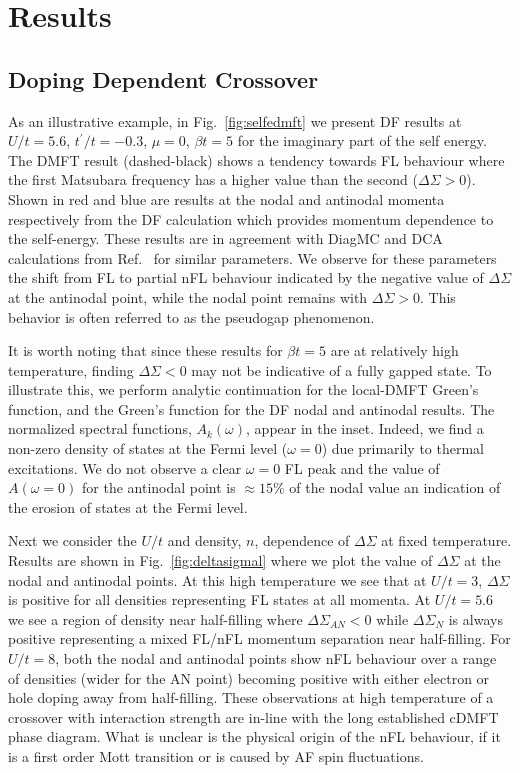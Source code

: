 \documentclass[twocolumn,notitlepage,prb,superscriptaddress,showpacs]{revtex4-1}
\begin{document}
\section{Results  \label{sec:results}}


\subsection{Doping Dependent Crossover}
As an illustrative example, in Fig.~\ref{fig:selfedmft} we present DF results at $U/t=5.6$, $t^\prime/t=-0.3$, $\mu=0$, $\beta t=5$ for the imaginary part of the self energy. The DMFT result (dashed-black) shows a tendency towards FL behaviour where the first Matsubara frequency has a higher value than the second ($\Delta \Sigma > 0$).  Shown in red and blue are results at the nodal and antinodal momenta respectively from the DF calculation which provides momentum dependence to the self-energy. 
These results are in agreement with  DiagMC and DCA calculations from  Ref.~ for similar parameters.  We observe for these parameters the shift from FL to partial nFL behaviour indicated by the negative value of $\Delta \Sigma$ at the antinodal point, while the nodal point remains with $\Delta \Sigma >0$.
This behavior is often referred to as the pseudogap phenomenon.\cite{gull:2009, ferrero:2009, yrzreview:2012, leblanc:2011} 

It is worth noting that since these results for $\beta t=5$ are at relatively high temperature, finding $\Delta \Sigma <0$ may not be indicative of a fully gapped state.  
To illustrate this, we perform analytic continuation\cite{maxent} for the local-DMFT Green's function, and the Green's function for the DF nodal and antinodal results.  
The normalized spectral functions, $A_k(\omega)$, appear in the inset.  Indeed, we find a non-zero density of states at the Fermi level ($\omega=0$) due primarily to thermal excitations.  
We do not observe a clear $\omega=0$ FL peak and the value of $A(\omega=0)$ for the antinodal point is $\approx 15\%$ of the nodal value an indication of the erosion of states at the Fermi level. 

Next we consider the $U/t$ and density, $ n $, dependence of $\Delta \Sigma$ at fixed temperature.  Results are shown in Fig.~\ref{fig:deltasigmal} where we plot the value of $\Delta \Sigma$ at the nodal and antinodal points.  At this high temperature we see that at $U/t=3$, $\Delta \Sigma$ is positive for all densities representing FL states at all momenta. 
At $U/t=5.6$ we see a region of density near half-filling where $\Delta \Sigma_{AN}<0$ while $\Delta\Sigma_N$ is always positive representing a mixed FL/nFL momentum separation near half-filling.   For $U/t=8$, both the nodal and antinodal points show nFL behaviour over a range of densities (wider for the AN point) becoming positive with either electron or hole doping away from half-filling.\cite{Gull10_clustercompare,gull:2009}
These observations at high temperature of a crossover with interaction strength are in-line with the long established cDMFT phase diagram.\cite{park:2008} What is unclear is the physical origin of the nFL behaviour, if it is a first order Mott transition or is caused by AF spin fluctuations.
\end{document}
